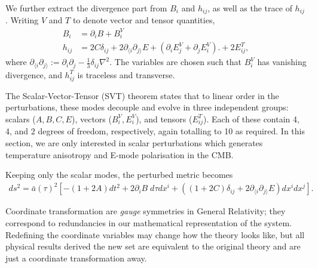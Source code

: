 We further extract the divergence part from $B_i$ and $h_{ij}$, as well as the trace of $h_{ij}$. Writing $V$ and $T$ to denote vector and tensor quantities, 
\begin{align}
	B_i &= \partial_i B + B_i^V \\
	h_{ij} &= 2C \delta_{ij} + 2\partial_{\langle i}\partial_{j \rangle} E + (\partial_i E_j^V + \partial_j E_i^V). + 2E^T_{ij},
\end{align}
where $\partial_{\langle i}\partial_{j \rangle} := \partial_i \partial_j - \frac{1}{3} \delta_{ij} \nabla^2$.
The variables are chosen such that $B_i^V$ has vanishing divergence, and $h_{ij}^T$ is traceless and transverse.

The Scalar-Vector-Tensor (SVT) theorem states that to linear order in the perturbations, these modes decouple and evolve in three independent groups: scalars ($A,B,C,E$), vectors ($B_i^V,E_i^V$), and tensors ($E_{ij}^T$). Each of these contain 4, 4, and 2 degrees of freedom, respectively, again totalling to 10 as required. In this section, we are only interested in scalar perturbations which generates temperature anisotropy and E-mode polarisation in the CMB.

Keeping only the scalar modes, the perturbed metric becomes
\begin{align}
	ds^2 = \bar{a}(\tau)^2 \left[ -(1+2A) dt^2 + 2 \partial_i B \; d\tau dx^i + \left( (1+2C)\delta_{ij} + 2\partial_{\langle i}\partial_{j \rangle} E \right) dx^i dx^j \right]. \label{eqn:perturbed_metric_scalar}
\end{align}

Coordinate transformation are \textit{gauge} symmetries in General Relativity; they correspond to redundancies in our mathematical representation of the system. Redefining the coordinate variables may change how the theory looks like, but all physical results derived the new set are equivalent to the original theory and are just a coordinate transformation away.

